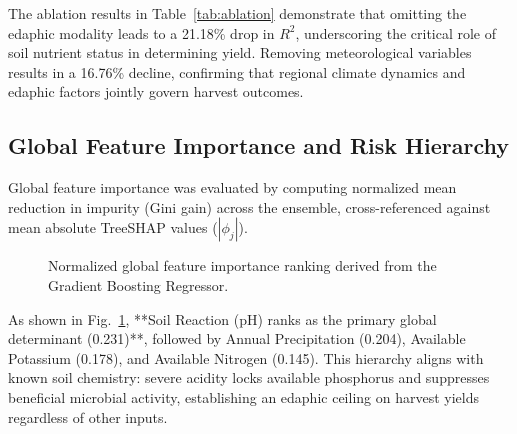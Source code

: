 \documentclass[conference]{IEEEtran}
\begin{document}
The ablation results in Table~\ref{tab:ablation} demonstrate that omitting the edaphic modality leads to a 21.18\% drop in $R^2$, underscoring the critical role of soil nutrient status in determining yield. Removing meteorological variables results in a 16.76\% decline, confirming that regional climate dynamics and edaphic factors jointly govern harvest outcomes.

\subsection{Global Feature Importance and Risk Hierarchy}
Global feature importance was evaluated by computing normalized mean reduction in impurity (Gini gain) across the ensemble, cross-referenced against mean absolute TreeSHAP values ($|\phi_j|$).

\begin{figure}[!t]
\centering
{}
\caption{Normalized global feature importance ranking derived from the Gradient Boosting Regressor.}
\label{fig:importance}
\end{figure}

As shown in Fig.~\ref{fig:importance}, **Soil Reaction ($\text{pH}$) ranks as the primary global determinant (0.231)**, followed by Annual Precipitation (0.204), Available Potassium (0.178), and Available Nitrogen (0.145). This hierarchy aligns with known soil chemistry: severe acidity locks available phosphorus and suppresses beneficial microbial activity, establishing an edaphic ceiling on harvest yields regardless of other inputs.
\end{document}
